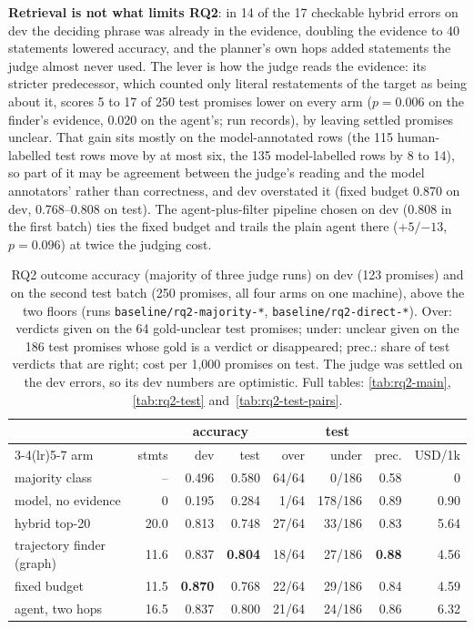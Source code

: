 \documentclass[11pt]{article}
\newcommand{\run}[1]{\nolinkurl{#1}}
\begin{document}
\textbf{Retrieval is not what limits RQ2}: in 14 of the 17 checkable hybrid errors on dev the deciding phrase was already in the evidence, doubling the evidence to 40 statements lowered accuracy, and the planner's own hops added statements the judge almost never used. The lever is how the judge reads the evidence: its stricter predecessor, which counted only literal restatements of the target as being about it, scores 5 to 17 of 250 test promises lower on every arm ($p = 0.006$ on the finder's evidence, $0.020$ on the agent's; run records), by leaving settled promises unclear. That gain sits mostly on the model-annotated rows (the 115 human-labelled test rows move by at most six, the 135 model-labelled rows by 8 to 14), so part of it may be agreement between the judge's reading and the model annotators' rather than correctness, and dev overstated it (fixed budget 0.870 on dev, 0.768--0.808 on test). The agent-plus-filter pipeline chosen on dev (0.808 in the first batch) ties the fixed budget and trails the plain agent there ($+5 / {-13}$, $p = 0.096$) at twice the judging cost.

\begin{table}[t]
\centering\scriptsize
\setlength{\tabcolsep}{2pt}
\begin{tabular*}{\columnwidth}{@{}l@{\extracolsep{\fill}}rrrrrrr@{}}
\toprule
 & & \multicolumn{2}{c}{accuracy} & \multicolumn{3}{c}{test} & \\
\cmidrule(lr){3-4}\cmidrule(lr){5-7}
arm & stmts & dev & test & over & under & prec. & USD/1k \\
\midrule
majority class & -- & 0.496 & 0.580 & 64/64 & 0/186 & 0.58 & 0 \\
model, no evidence & 0 & 0.195 & 0.284 & 1/64 & 178/186 & 0.89 & 0.90 \\
\midrule
hybrid top-20 & 20.0 & 0.813 & 0.748 & 27/64 & 33/186 & 0.83 & 5.64 \\
trajectory finder (graph) & 11.6 & 0.837 & \textbf{0.804} & 18/64 & 27/186 & \textbf{0.88} & 4.56 \\
fixed budget & 11.5 & \textbf{0.870} & 0.768 & 22/64 & 29/186 & 0.84 & 4.59 \\
agent, two hops & 16.5 & 0.837 & 0.800 & 21/64 & 24/186 & 0.86 & 6.32 \\
\bottomrule
\end{tabular*}
\caption{RQ2 outcome accuracy (majority of three judge runs) on dev (123 promises) and on the second test batch (250 promises, all four arms on one machine), above the two floors (runs \run{baseline/rq2-majority-*}, \run{baseline/rq2-direct-*}). Over: verdicts given on the 64 gold-unclear test promises; under: unclear given on the 186 test promises whose gold is a verdict or disappeared; prec.: share of test verdicts that are right; cost per 1,000 promises on test. The judge was settled on the dev errors, so its dev numbers are optimistic. Full tables: \ref{tab:rq2-main}, \ref{tab:rq2-test} and~\ref{tab:rq2-test-pairs}.}
\label{tab:rq2-summary}
\end{table}
\end{document}
